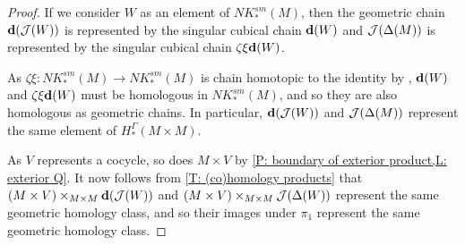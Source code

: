\begin{proof}
	If we consider $W$ as an element of $NK_*^{sm}(M)$, then the geometric chain $\mathbf{d}(\mathcal{J}(W))$ is represented by the singular cubical chain $\mathbf{d}(W)$ and $\mathcal{J}(\Delta(M))$ is represented by the singular cubical chain $\zeta\xi\mathbf{d}(W)$.

	As $\zeta\xi: NK_*^{sm}(M) \to NK_*^{sm}(M)$ is chain homotopic to the identity by \cite[Section XI.5]{Mas91}, $\mathbf{d}(W)$ and $\zeta\xi\mathbf{d}(W)$ must be homologous in $NK_*^{sm}(M)$, and so they are also homologous as geometric chains.
	In particular, $\mathbf{d}(\mathcal{J}(W))$ and $\mathcal{J}(\Delta(M))$ represent the same element of $H_*^\Gamma(M \times M)$.

	As $V$ represents a cocycle, so does $M \times V$ by \cref{P: boundary of exterior product,L: exterior Q}.
	It now follows from \cref{T: (co)homology products} that
	$(M \times V)\times_{M \times M} \mathbf{d}(\mathcal{J}(W))$ and $(M \times V)\times_{M \times M} \mathcal{J}(\Delta(W))$ represent the same geometric homology class, and so their images under $\pi_1$ represent the same geometric homology class.
\end{proof}

